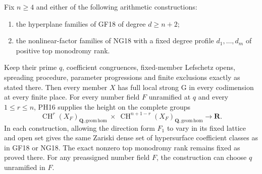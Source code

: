 \begin{theorem}
\label{r18gh:global}
Fix $n\ge4$ and either of the following arithmetic
constructions:
\begin{enumerate}
\item the hyperplane families of GF18 of degree
$d\ge n+2$;
\item the nonlinear-factor families of NG18 with
a fixed degree profile $d_1,\ldots,d_m$ of positive
top monodromy rank.
\end{enumerate}
Keep their prime $q$, coefficient congruences,
fixed-member Lefschetz opens, spreading procedure,
parameter progressions and finite exclusions exactly
as stated there.  Then every member $X$ has full
local strong G in every codimension at every finite
place.  For every number field $F$ unramified at $q$
and every $1\le r\le n$, PH16 supplies the height
on the complete groups
\[
 \operatorname{CH}^r(X_F)_{\mathbf Q,\mathrm{geom\,hom}}
 \ \times\
 \operatorname{CH}^{n+1-r}(X_F)_{\mathbf Q,\mathrm{geom\,hom}}
                         \longrightarrow\mathbf R.
 \tag{GH18.1}\label{r18gh:all-heights}
\]
In each construction, allowing the direction form
$F_1$ to vary in its fixed lattice and open set
gives the same Zariski dense set of hypersurface
coefficient classes as in GF18 or NG18.  The exact
nonzero top monodromy rank remains fixed as proved
there.  For any preassigned number field $F$, the
construction can choose $q$ unramified in $F$.
\end{theorem}


